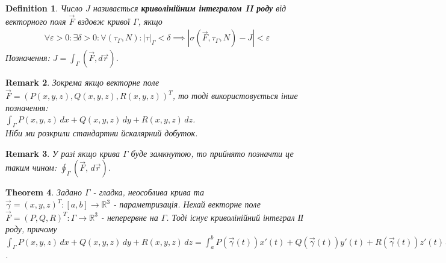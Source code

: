 \documentclass[a4paper, 10pt]{article}
\theoremstyle{theoremdd}
\newtheorem{theorem}{Theorem}[subsection]
\theoremstyle{theoremdd}
\newtheorem{definition}[theorem]{Definition}
\theoremstyle{theoremdd}
\theoremstyle{theoremdd}
\theoremstyle{theoremdd}
\newtheorem{proposition}[theorem]{Proposition}
\theoremstyle{theoremdd}
\newtheorem{remark}[theorem]{Remark}
\theoremstyle{theoremdd}
\theoremstyle{theoremdd}
\newcommand\Norm[1]{\left\lVert#1\right\rVert}
\begin{document}
\begin{definition}
Число $J$ називається \textbf{криволінійним інтегралом II роду} від векторного поля $\vec{F}$ вздовж кривої $\Gamma$, якщо
\begin{align*}
\forall \varepsilon > 0: \exists \delta > 0: \forall (\tau_\Gamma, N): |\tau|_\Gamma < \delta \implies |\sigma(\vec{F},\tau_\Gamma, N) - J| < \varepsilon
\end{align*}
Позначення: $J = \displaystyle\int_\Gamma (\vec{F}, d\vec{r})$.
\end{definition}

\begin{remark}
Зокрема якщо векторне поле $\vec{F} = ( P(x,y,z), Q(x,y,z), R(x,y,z) )^T$, то тоді використовується інше позначення:\\
$\displaystyle\int_\Gamma P(x,y,z)\,dx + Q(x,y,z)\,dy + R(x,y,z)\,dz$.\\
Ніби ми розкрили стандартни йскалярний добуток.
\end{remark}

\begin{remark}
У разі якщо крива $\Gamma$ буде замкнутою, то прийнято позначти це таким чином: $\displaystyle\oint_\Gamma (\vec{F}, \,d\vec{r})$.
\end{remark}

\begin{theorem}
Задано $\Gamma$ - гладка, неособлива крива та $\vec{\gamma} = (x,y,z)^T: [a,b] \to \mathbb{R}^3$ - параметризація. Нехай векторне поле $\vec{F} = (P,Q,R)^T: \Gamma \to \mathbb{R}^3$ - неперервне на $\Gamma$. Тоді існує криволінійний інтеграл ІІ роду, причому\\
$\displaystyle\int_\Gamma P(x,y,z)\,dx + Q(x,y,z)\,dy + R(x,y,z)\,dz = \int_a^b P(\vec{\gamma}(t))x'(t) + Q(\vec{\gamma}(t))y'(t) + R(\vec{\gamma}(t))z'(t)\,dt$.
\end{theorem}
\end{document}
